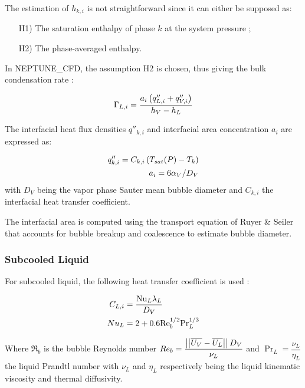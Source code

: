 The estimation of $h_{k,i}$ is not straightforward since it can either be supposed as:

\begin{enumerate}
\item[H1)] The saturation enthalpy of phase $k$ at the system pressure ;
\item[H2)] The phase-averaged enthalpy.
\end{enumerate}

\npar
In NEPTUNE\_CFD, the assumption H2 is chosen, thus giving the bulk condensation rate :

\begin{equation}
\Gamma_{L,i}=\frac{a_{i}\left( q''_{L,i}+q''_{V,i} \right)}{h_{V}-h_{L}}
\label{eq:ncfd_cond_rate}
\end{equation}


The interfacial heat flux densities $q''_{k,i}$ and interfacial area concentration $a_{i}$ are expressed as:

\begin{align}
q''_{k,i}=C_{k,i}\left( T_{sat}(P)-T_{k} \right)\\
a_{i}=6 \alpha_{V}/D_{V}
\end{align}
with $D_{V}$ being the vapor phase Sauter mean bubble diameter and $C_{k,i}$ the interfacial heat transfer coefficient.

\npar

\begin{note*}{}
The interfacial area is computed using the transport equation of {Ruyer} \& {Seiler} \cite{ruyer_modelisation_2009} that accounts for bubble breakup and coalescence to estimate bubble diameter.
\end{note*}


\subsubsection{Subcooled Liquid}

For subcooled liquid, the following heat transfer coefficient is used \cite{ranz_evaporation_1952, manon_contribution_2000}:

\begin{align}
C_{L,i}&=\frac{\Nu_{L}\lambda_{L}}{D_{V}}\\
%
Nu_{L}&=2+0.6\Re_{b}^{1/2}\Pr_{L}^{1/3}
\label{eq:ncfd_subcooled_L}
\end{align}

Where $\Re_{b}$ is the bubble Reynolds number $Re_{b}=\dfrac{\left|\left|{\overline{U_{V}}-\overline{U_{L}}}\right|\right|D_{V} }{\nu_{L}}$ and $\Pr_{L}=\dfrac{\nu_{L}}{\eta_{L}}$ the liquid Prandtl number with $\nu_{L}$ and $\eta_{L}$ respectively being the liquid kinematic viscosity and thermal diffusivity.


